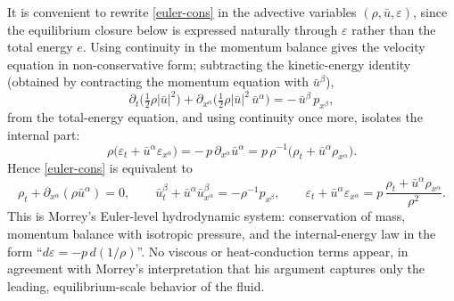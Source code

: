 \documentclass[11pt]{article}
\begin{document}
It is convenient to rewrite \eqref{euler-cons} in the advective variables $(\rho,\bar u,\varepsilon)$, since the equilibrium closure below is expressed naturally through $\varepsilon$ rather than the total energy $e$. Using continuity in the momentum balance gives the velocity equation in non-conservative form; subtracting the kinetic-energy identity (obtained by contracting the momentum equation with $\bar u^\beta$),
\[
\partial_t\!\Big(\tfrac12\rho|\bar u|^2\Big)+\partial_{x^\alpha}\!\Big(\tfrac12\rho|\bar u|^2\,\bar u^\alpha\Big)
= -\,\bar u^\beta\,p_{x^\beta},
\]
from the total-energy equation, and using continuity once more, isolates the internal part:
\[
\rho\big(\varepsilon_t+\bar u^\alpha \varepsilon_{x^\alpha}\big) = -\,p\,\partial_{x^\alpha}\bar u^\alpha
= p\,\rho^{-1}\big(\rho_t+\bar u^\alpha\rho_{x^\alpha}\big).
\]
Hence \eqref{euler-cons} is equivalent to
\begin{equation}\label{euler-adv}\tag{8.3}
\rho_t + \partial_{x^\alpha}(\rho \bar u^\alpha)=0,
\qquad
\bar u^\beta_t + \bar u^\alpha \bar u^\beta_{x^\alpha}
   = - \rho^{-1} p_{x^\beta},
\qquad
\varepsilon_t + \bar u^\alpha \varepsilon_{x^\alpha}
   = p\,\frac{\rho_t+\bar u^\alpha \rho_{x^\alpha}}{\rho^2}.
\end{equation}
This is Morrey's Euler-level hydrodynamic system: conservation of mass, momentum balance with isotropic pressure, and the internal-energy law in the form ``$d\varepsilon=-p\,d(1/\rho)$''. No viscous or heat-conduction terms appear, in agreement with Morrey's interpretation that his argument captures only the leading, equilibrium-scale behavior of the fluid.
\end{document}
